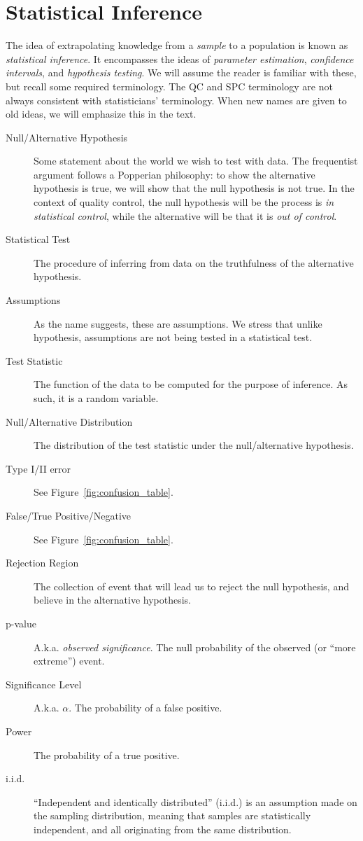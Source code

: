\chapter{Statistical Inference} 
\label{sec:inference}

The idea of extrapolating knowledge from a \emph{sample} to a population is known as \emph{statistical inference}.
It encompasses the ideas of \emph{parameter estimation}, \emph{confidence intervals}, and \emph{hypothesis testing}.
We will assume the reader is familiar with these, but recall some required terminology.
The QC and SPC terminology are not always consistent with statisticians' terminology. When new names are given to old ideas, we will emphasize this in the text.

\begin{description}
\item [Null/Alternative Hypothesis] Some statement about the world we wish to test with data. The frequentist argument follows a Popperian philosophy: to show the alternative hypothesis is true, we will show that the null hypothesis is not true. 
In the context of quality control, the null hypothesis will be the process is \emph{in statistical control}, while the alternative will be that it is \emph{out of control}.
\item [Statistical Test] The procedure of inferring from data on the truthfulness of the alternative hypothesis.
\item [Assumptions] As the name suggests, these are assumptions. We stress that unlike hypothesis, assumptions are not being tested in a statistical test. 
\item [Test Statistic] The function of the data to be computed for the purpose of inference. As such, it is a random variable. 
\item [Null/Alternative Distribution] The distribution of the test statistic under the null/alternative hypothesis.
\item [Type I/II error] See Figure~\ref{fig:confusion_table}.
\item [False/True Positive/Negative] See Figure~\ref{fig:confusion_table}.
\item [Rejection Region] The collection of event that will lead us to reject the null hypothesis, and believe in the alternative hypothesis.
\item [p-value] A.k.a. \emph{observed significance}. The null probability of the observed (or ``more extreme'') event.
\item [Significance Level] A.k.a. $\alpha$. The probability of a false positive.
\item [Power] The probability of a true positive.
\item [i.i.d.] ``Independent and identically distributed'' (i.i.d.) is an assumption made on the sampling distribution, meaning that samples are statistically independent, and all originating from the same distribution.

\end{description}

